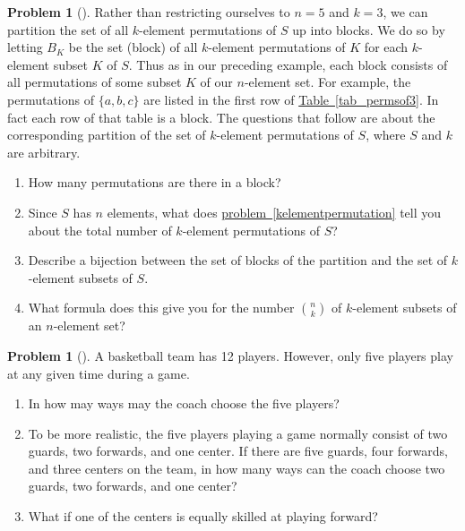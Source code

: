 \documentclass[10pt,]{book}
\theoremstyle{plain}
\theoremstyle{definition}
\newtheorem{activity}[project]{Problem}
\theoremstyle{definition}
\numberwithin{equation}{chapter}
\newcommand{\importantarrow}{\Rightarrow}
\begin{document}
\begin{activity}[] \label{formulanchoosek}
Rather than restricting ourselves to \(n=5\) and \(k=3\), we can partition the set of all \(k\)-element permutations of \(S\) up into blocks. We do so by letting \(B_K\) be the set (block) of all \(k\)-element permutations of \(K\) for each \(k\)-element subset \(K\) of \(S\). Thus as in our preceding example, each block consists of all permutations of some subset \(K\) of our \(n\)-element set. For example, the permutations of \(\{a,b,c\}\) are listed in the first row of \hyperref[tab_permsof3]{Table~\ref{tab_permsof3}}. In fact each row of that table is a block. The questions that follow are about the corresponding partition of the set of \(k\)-element permutations of \(S\), where \(S\) and \(k\) are arbitrary.%
\begin{enumerate}[font=\bfseries,label=(\alph*),ref=\alph*]
\item\label{task-38} \marginsymbol[-2.5em]{} How many permutations are there in a block?%
\item\label{task-39} \marginsymbol[-2.5em]{} Since \(S\) has \(n\) elements, what does \hyperref[kelementpermutation]{problem~\ref{kelementpermutation}} tell you about the total number of \(k\)-element permutations of \(S\)?%
\item\label{task-40} \marginsymbol[-2.5em]{} Describe a bijection between the set of blocks of the partition and the set of \(k\)-element subsets of \(S\).%
\item\label{formulanchoosekfinal} \marginsymbol[-2.5em]{} What formula does this give you for the number \(\binom{n}{k}\) of \(k\)-element subsets of an \(n\)-element set?%
\end{enumerate}
\end{activity}
\begin{activity}[]\marginsymbol[-1em]{\pdftooltip{$\importantarrow$}{especially interesting}} \label{activity-40}
A basketball team has 12 players. However, only five players play at any given time during a game.%
\begin{enumerate}[font=\bfseries,label=(\alph*),ref=\alph*]
\item\label{task-42} \marginsymbol[-2.5em]{} In how may ways may the coach choose the five players?%
\item\label{task-43} \marginsymbol[-2.5em]{} To be more realistic, the five players playing a game normally consist of two guards, two forwards, and one center.  If there are five guards, four forwards, and three centers on the team, in how many ways can the coach choose two guards, two forwards, and one center?%
\item\label{task-44} \marginsymbol[-2.5em]{} What if one of the centers is equally skilled at playing forward?%
\end{enumerate}
\end{activity}
\end{document}
